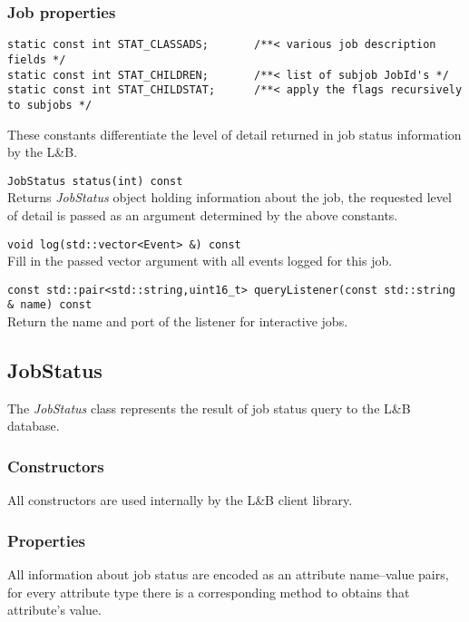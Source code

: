 \documentclass{egee}
\def\LB{L\&B\xspace}
\begin{document}
\subsubsection*{Job properties}
\begin{description}

\item{
\begin{verbatim}
static const int STAT_CLASSADS;       /**< various job description fields */
static const int STAT_CHILDREN;       /**< list of subjob JobId's */
static const int STAT_CHILDSTAT;      /**< apply the flags recursively to subjobs */
\end{verbatim}
}
These constants differentiate the level of detail returned in job
status information by the \LB. 

\item{\verb|JobStatus status(int) const|}\\
Returns \emph{JobStatus} object holding information about the job, the
requested level of detail is passed as an argument determined by the
above constants.

\item{\verb|void log(std::vector<Event> &) const|}\\
Fill in the passed vector argument with all events logged for this job.

\item{\verb|const std::pair<std::string,uint16_t> queryListener(const std::string & name) const|}\\
Return the name and port of the listener for interactive jobs. 

\end{description}

\subsection*{JobStatus}
The \emph{JobStatus} class represents the result of job status query
to the \LB database. 

\subsubsection*{Constructors}
All constructors are used internally by the \LB client library.

\subsubsection*{Properties}
All information about job status are encoded as an attribute
name--value pairs, for every attribute type there is a corresponding 
method to obtains that attribute's value. 
\end{document}
